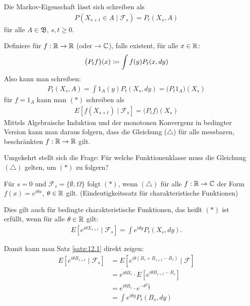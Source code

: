 \documentclass[a4paper,twoside,DIV15,BCOR12mm]{scrbook}
\newcommand{\cF}{\mathcal F}
\newcommand{\borel}{{\mathfrak B}}
\begin{document}
\begin{bemerkung}
Die Markov-Eigenschaft lässt sich schreiben als
\begin{align*}
P(X_{s+t}\in A\mid \cF_s) = P_t(X_s,A) \tag{$*$}
\end{align*}
für alle $A\in\borel$, $s,t\ge 0$.

Definiere für $f:\mathbb{R}\to\mathbb{R}$ (oder $\to \mathbb{C}$), falls existent, für alle $x\in \mathbb{R}$:
\begin{align*}
\big(P_tf\big)(x) \da \int f(y) P_t(x,dy)
\end{align*}
Also kann man schreiben:
\begin{align*}
P_t(X_s,A) = \int 1_A(y) P_t(X_s,dy) = \big(P_t1_A\big)(X_s)
\end{align*}
für $f=1_A$ kann man $(*)$ schreiben als
\begin{align*}
E[f(X_{s+t}) \mid \cF_s] = \big(P_tf\big) (X_s) \tag{$\triangle$}
\end{align*}
Mittels Algebraische Induktion und der monotonen Konvergenz in bedingter Version kann man daraus folgern, dass die Gleichung ($\triangle$) für alle messbaren, beschränkten $f:\mathbb{R}\to\mathbb{R}$ gilt.

Umgekehrt stellt sich die Frage: Für welche Funktionenklasse muss die Gleichung $(\triangle)$ gelten, um $(*)$ zu folgern?

Für $s=0$ und $\cF_s=\{\emptyset, \Omega\}$ folgt $(*)$, wenn $(\triangle)$ für alle $f:\mathbb{R}\to \mathbb{C}$ der Form $f(x) = e^{i\theta x}$, $\theta\in \mathbb{R}$ gilt. (Eindeutigkeitssatz für charakteristische Funktionen)

Dies gilt auch für bedingte charakteristische Funktionen, das heißt $(*)$ ist erfüllt, wenn für alle $\theta\in \mathbb{R}$ gilt:
\begin{align*}
E[e^{i\theta X_{s+t}}\mid \cF_s] = \int e^{i\theta y}P_t(X_s,dy).
\end{align*}

Damit kann man Satz \ref{satz:12.1} direkt zeigen:
\begin{align*}
E[e^{i\theta B_{s+t}}\mid \cF_s] &= E[e^{i\theta(B_s+B_{s+t}-B_s)}\mid \cF] \\
&= e^{i\theta B_s} \cdot E[e^{i\theta B_{s+t}-B_s}] \\
&= e^{i\theta B_s} \cdot e^{-\theta^2\frac t2} \\
&= \int e^{i\theta y}P_t(B_s,dy)
\end{align*}
\end{bemerkung}
\end{document}
